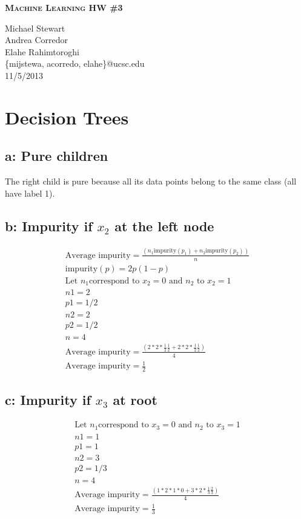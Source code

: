 \documentclass{article}
\newcommand{\header}[5]{
        \begin{minipage}[h!]{0.63\textwidth}
                \centering
                { \LARGE \textbf{ \textsc{#1} } }
        \end{minipage}
        \begin{minipage}[h!]{0.37\textwidth}
                \centering
                {#2}\\
                {#3}\\
        \end{minipage}
}
\begin{document}
\header{Machine Learning HW \#3}
       {Michael Stewart\\Andrea Corredor\\Elahe Rahimtoroghi\\
       \{mijstewa, acorredo, elahe\}@ucsc.edu}
       {11/5/2013}
\\\\


\section{Decision Trees}

\subsection*{a: Pure children}
The right child is pure because all its data points belong to the same class (all have label 1).

\subsection*{b: Impurity if $x_2$ at the left node}
\begin{align*}
\text{Average impurity} = \frac{\left( n_1 \text{impurity}(p_1) + n_2 \text{impurity}(p_2) \right)}{n} \\
\text{impurity}(p) = 2p(1-p) \\  
\text{Let } n_1 \text{correspond to } x_2 = 0 \text{ and } n_2 \text{ to } x_2 = 1 \\
n1 = 2 \\
p1 = 1/2 \\
n2 = 2 \\
p2 = 1/2 \\
n = 4 \\
\text{Average impurity} = \frac{\left( 2*2*\frac{1}{2}\frac{1}{2}  + 2*2* \frac{1}{2}\frac{1}{2} \right)}{4} \\
\text{Average impurity} = \frac{1}{2}
\end{align*}
\subsection*{c: Impurity if $x_3$ at root}
\begin{align*}
\text{Let } n_1 \text{correspond to } x_3 = 0 \text{ and } n_2 \text{ to } x_3 = 1 \\
n1 = 1 \\
p1 = 1 \\
n2 = 3 \\
p2 = 1/3 \\
n = 4 \\
\text{Average impurity} = \frac{\left( 1*2*1*0  + 3*2* \frac{1}{3}\frac{2}{3} \right)}{4} \\
\text{Average impurity} = \frac{1}{3}
\end{align*}
\end{document}
